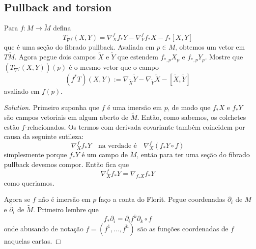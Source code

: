 \subsection{Pullback and torsion}
\begin{exercise}\leavevmode
Para \(f: M \to \tilde{M}\) defina
\[T_{\nabla^f}(X,Y)=\nabla_X^f f_*Y-\nabla_Y^f f_*X-f_*[X,Y]\]
que é uma seção do fibrado pullback. Avaliada em \(p\in M\), obtemos um vetor em \(T\tilde{M}\). Agora pegue dois campos \(\tilde{X}\) e \(\tilde{Y}\) que estendem \(f_{*,p}X_p\) e \(f_{*,p}Y_p\). Mostre que \((T_{\nabla^f}(X,Y))(p)\) é o mesmo vetor que o campo
\[(f^* T)(X,Y):=\nabla_{\tilde{X}}\tilde{Y}-\nabla_{\tilde{Y}}\tilde{X}-[\tilde{X},\tilde{Y}]\]
avaliado em \(f(p)\).
\end{exercise}
\begin{proof}[Solution]\leavevmode
Primeiro suponha que \(f\) é uma imersão em \(p\), de modo que \(f_*X\) e \(f_*Y\) são campos vetoriais em algum aberto de \(\tilde{M}\). Então, como sabemos, os colchetes estão \(f\)-relacionados. Os termos com derivada covariante também coincidem por causa da seguinte sutileza:
\[\nabla^f_Xf_*Y\quad \text{na verdade é}\quad \nabla_X^f(f_*Y\circ f) \]
simplesmente porque \(f_*Y\) é um campo de \(\tilde{M}\), então para ter uma seção do fibrado pullback devemos compor. Então fica que
\[\nabla_X^f f_*Y=\nabla_{f_* X}f_*Y\]
como queriamos.

Agora se \(f\) não é imersão em \(p\) faço a conta do Florit. Pegue coordenadas \(\partial_i\) de \(M\) e \(\tilde{\partial_i}\) de \(\tilde{M}\). Primeiro lembre que
\[f_*\partial_i=\partial_if^k\partial_k\circ f\]
onde abusando de notação \(f =(f^1,\ldots,f^{\tilde{n}})\) são as funções coordenadas de \(f\) naquelas cartas.


\end{proof}
